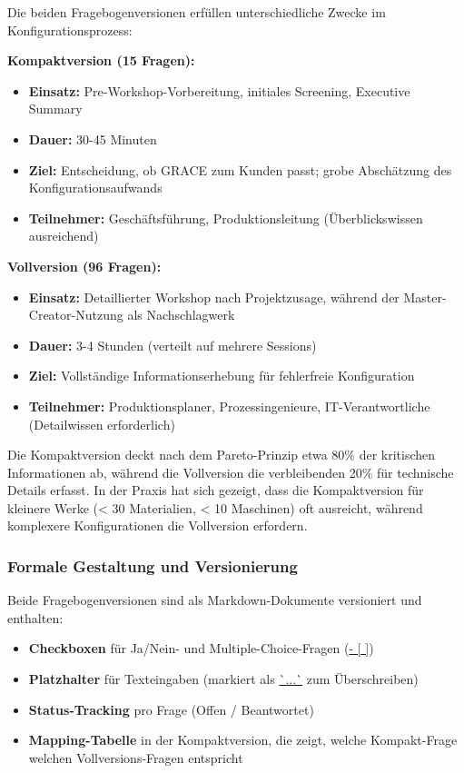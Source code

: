 Die beiden Fragebogenversionen erfüllen unterschiedliche Zwecke im Konfigurationsprozess:

\textbf{Kompaktversion (15 Fragen):}
\begin{itemize}
    \item \textbf{Einsatz:} Pre-Workshop-Vorbereitung, initiales Screening, Executive Summary
    \item \textbf{Dauer:} 30-45 Minuten
    \item \textbf{Ziel:} Entscheidung, ob GRACE zum Kunden passt; grobe Abschätzung des Konfigurationsaufwands
    \item \textbf{Teilnehmer:} Geschäftsführung, Produktionsleitung (Überblickswissen ausreichend)
\end{itemize}

\textbf{Vollversion (96 Fragen):}
\begin{itemize}
    \item \textbf{Einsatz:} Detaillierter Workshop nach Projektzusage, während der Master-Creator-Nutzung als Nachschlagwerk
    \item \textbf{Dauer:} 3-4 Stunden (verteilt auf mehrere Sessions)
    \item \textbf{Ziel:} Vollständige Informationserhebung für fehlerfreie Konfiguration
    \item \textbf{Teilnehmer:} Produktionsplaner, Prozessingenieure, IT-Verantwortliche (Detailwissen erforderlich)
\end{itemize}

\noindent Die Kompaktversion deckt nach dem Pareto-Prinzip etwa 80\% der kritischen Informationen ab, während die Vollversion die verbleibenden 20\% für technische Details erfasst. In der Praxis hat sich gezeigt, dass die Kompaktversion für kleinere Werke (< 30 Materialien, < 10 Maschinen) oft ausreicht, während komplexere Konfigurationen die Vollversion erfordern.

\subsubsection{Formale Gestaltung und Versionierung}

Beide Fragebogenversionen sind als Markdown-Dokumente versioniert und enthalten:

\begin{itemize}
    \item \textbf{Checkboxen} für Ja/Nein- und Multiple-Choice-Fragen (\url{- [ ]})
    \item \textbf{Platzhalter} für Texteingaben (markiert als \url{`...`} zum Überschreiben)
    \item \textbf{Status-Tracking} pro Frage (\glqq Offen\grqq{} / \glqq Beantwortet\grqq)
    \item \textbf{Mapping-Tabelle} in der Kompaktversion, die zeigt, welche Kompakt-Frage welchen Vollversions-Fragen entspricht
\end{itemize}

